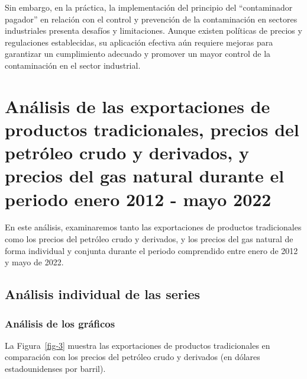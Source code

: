 \documentclass[
  a4paper,
]{article}
\begin{document}
Sin embargo, en la práctica, la implementación del principio del
``contaminador pagador'' en relación con el control y prevención de la
contaminación en sectores industriales presenta desafíos y limitaciones.
Aunque existen políticas de precios y regulaciones establecidas, su
aplicación efectiva aún requiere mejoras para garantizar un cumplimiento
adecuado y promover un mayor control de la contaminación en el sector
industrial.

\hypertarget{anuxe1lisis-de-las-exportaciones-de-productos-tradicionales-precios-del-petruxf3leo-crudo-y-derivados-y-precios-del-gas-natural-durante-el-periodo-enero-2012---mayo-2022}{%
\section{Análisis de las exportaciones de productos tradicionales,
precios del petróleo crudo y derivados, y precios del gas natural
durante el periodo enero 2012 - mayo
2022}\label{anuxe1lisis-de-las-exportaciones-de-productos-tradicionales-precios-del-petruxf3leo-crudo-y-derivados-y-precios-del-gas-natural-durante-el-periodo-enero-2012---mayo-2022}}

En este análisis, examinaremos tanto las exportaciones de productos
tradicionales como los precios del petróleo crudo y derivados, y los
precios del gas natural de forma individual y conjunta durante el
periodo comprendido entre enero de 2012 y mayo de 2022.

\hypertarget{anuxe1lisis-individual-de-las-series}{%
\subsection{Análisis individual de las
series}\label{anuxe1lisis-individual-de-las-series}}

\hypertarget{anuxe1lisis-de-los-gruxe1ficos}{%
\subsubsection{Análisis de los
gráficos}\label{anuxe1lisis-de-los-gruxe1ficos}}

La Figura~\ref{fig-3} muestra las exportaciones de productos
tradicionales en comparación con los precios del petróleo crudo y
derivados (en dólares estadounidenses por barril).
\end{document}
